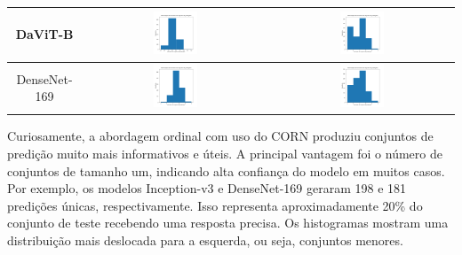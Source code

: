 \begin{table}[!htbp]
\begin{tabular}{|c|c|c|}
        DaViT-B & \includegraphics[width=0.25\textwidth]{figs/conformal_prediction/davit_base-msft_in1k_cp_cross_entropy.png} & \includegraphics[width=0.25\textwidth]{figs/conformal_prediction/davit_base-msft_in1k_cp_corn.png} \\ \hline
        DenseNet-169 & \includegraphics[width=0.25\textwidth]{figs/conformal_prediction/densenet169_cp_cross_entropy.png} & \includegraphics[width=0.25\textwidth]{figs/conformal_prediction/densenet169_cp_corn.png} \\ \hline
    \end{tabular}
\end{table}

Curiosamente, a abordagem ordinal com uso do CORN produziu conjuntos de predição muito mais informativos e úteis. A principal vantagem foi o número de conjuntos de tamanho um, indicando alta confiança do modelo em muitos casos. Por exemplo, os modelos Inception-v3 e DenseNet-169 geraram 198 e 181 predições únicas, respectivamente. Isso representa aproximadamente 20\% do conjunto de teste recebendo uma resposta precisa. Os histogramas mostram uma distribuição mais deslocada para a esquerda, ou seja, conjuntos menores.

